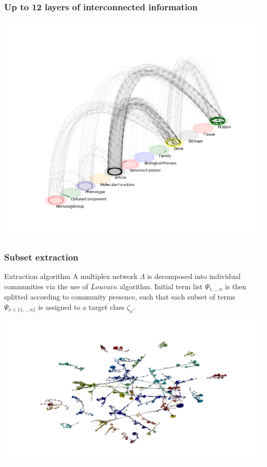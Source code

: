 \documentclass{beamer}
\begin{document}
\begin{frame}\frametitle{Up to 12 layers of interconnected information}  
  \includegraphics[scale=0.42]{images/SNPmpx}    
\end{frame}

\begin{frame}\frametitle{Subset extraction}

  \begin{block}{Extraction algorithm}
    A multiplex network $ \Lambda $ is decomposed into individual communities via the use of $Louvain$ algorithm. Initial term list $\Psi_{1,..,n} $ is then splitted according to community presence, such that each subset of terms $ \Psi_{x \in \{1,..,n\}} $ is assigned to a target class $ \zeta_{x} $.
  \end{block}
  \begin{center}
 \includegraphics[scale=0.15]{images/biomine_community}
  \end{center}

\end{frame}
\end{document}
